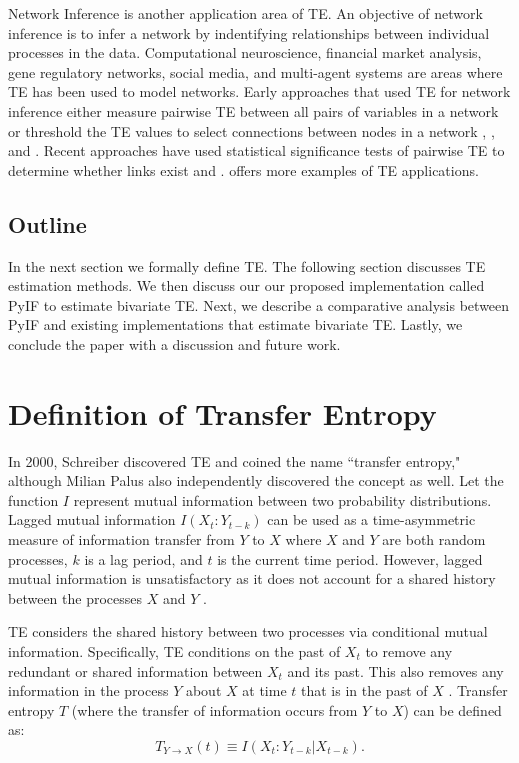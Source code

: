 \documentclass[conference]{IEEEtran}
\begin{document}
Network Inference is another application area of TE. An objective of network inference is to infer a network by indentifying relationships between individual processes in the data. Computational neuroscience, financial market analysis, gene regulatory networks, social media, and multi-agent systems are areas where TE has been used to model networks. Early approaches that used TE for  network inference either measure pairwise TE between all pairs of variables in a network or threshold the TE values to select connections between nodes in a network \cite{NetworkTEApp1}, \cite{NetworkTEApp2}, and \cite{NetworkTEApp3}. Recent approaches have used statistical significance tests of pairwise TE to determine whether links exist \cite{NetworkTEApp4} and \cite{NetworkTEApp5}. \cite{TEBook} offers more examples of TE applications.

\subsection{Outline}
In the next section we formally define TE. The following section discusses TE estimation methods. We then discuss our our proposed implementation called PyIF to estimate bivariate TE. Next, we describe a comparative analysis between PyIF and existing implementations that estimate bivariate TE. Lastly, we conclude the paper with a discussion and future work.


\section{Definition of Transfer Entropy}

In 2000, Schreiber \cite{IntroToTransferEntropy} discovered TE and coined the name ``transfer entropy," although Milian Palus \cite{IntroToTransferEntropy2} also independently discovered the concept as well. Let the function \(I\) represent mutual information between two probability distributions. Lagged mutual information \(I(X_t : Y_{t-k})\) can be used as a time-asymmetric measure of information transfer from \(Y\) to \(X\) where \(X\) and \(Y\) are both random processes, \(k\) is a lag period, and \(t\) is the current time period. However, lagged mutual information is unsatisfactory as it does not account for a shared history between the processes \(X\) and \(Y\) \cite{MIdiffTE}.

TE considers the shared history between two processes via conditional mutual information. Specifically, TE conditions on the past of \(X_t\) to remove any redundant or shared information between \(X_t\) and its past. This also removes any information in the process \(Y\) about \(X\) at time \(t\) that is in the past of \(X\) \cite{b359}. Transfer entropy \(T\) (where the transfer of information occurs from \(Y\) to \(X\)) can be defined as:
\begin{equation}
T_{Y \rightarrow X} (t) \equiv I(X_t: Y_{t-k} |  X_{t-k}).
\end{equation}
\end{document}
